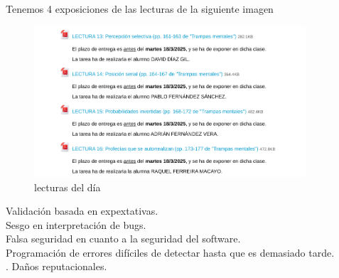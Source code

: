 \documentclass[12pt, a4paper, twoside]{article}
\begin{document}
Tenemos 4 exposiciones de las lecturas de la siguiente imagen
\begin{figure}[h]
    \centering
    \includegraphics[width=0.9\textwidth]{./images/0318.png}
    \caption{lecturas del día}
\end{figure}
Validación basada en expextativas.\\
Sesgo en interpretación de bugs.\\
Falsa seguridad en cuanto a la seguridad del software.\\
Programación de errores difíciles de detectar hasta que es demasiado tarde.\\.
Daños reputacionales.\\
\end{document}
